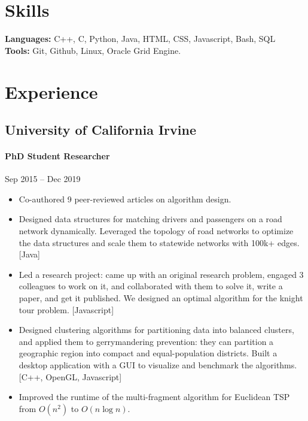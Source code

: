 \documentclass[letterpaper,10pt,oneside]{article}
\begin{document}
\section*{Skills}
\textbf{Languages:} C++, C, Python, Java, HTML, CSS, Javascript, Bash, SQL~
\textbf{Tools:} Git, Github, Linux, Oracle Grid Engine.

\section*{Experience}
\subsection*{University of California Irvine}
\vspace{-3px}
\paragraph*{PhD Student Researcher} \hfill Sep 2015 -- Dec 2019

\vspace{-1px}
\begin{itemize}[leftmargin=15px]
	\item Co-authored 9 peer-reviewed articles on algorithm design.
	\item Designed data structures for matching drivers and passengers on a road network dynamically. Leveraged the topology of road networks to optimize the data structures and scale them to statewide networks with 100k+ edges. [Java]   
	\item Led a research project: came up with an original research problem, engaged 3 colleagues to work on it, and collaborated with them to solve it, write a paper, and get it published. We designed an optimal algorithm for the knight tour problem. [Javascript]
	\item Designed clustering algorithms for partitioning data into balanced clusters, and applied them to gerrymandering prevention: they can partition a geographic region into compact and equal-population districts. Built a desktop application with a GUI to visualize and benchmark the algorithms. [C++, OpenGL, Javascript]
	\item Improved the runtime of the multi-fragment algorithm for Euclidean TSP from $O(n^2)$ to $O(n\log n)$.
\end{itemize}
\end{document}
